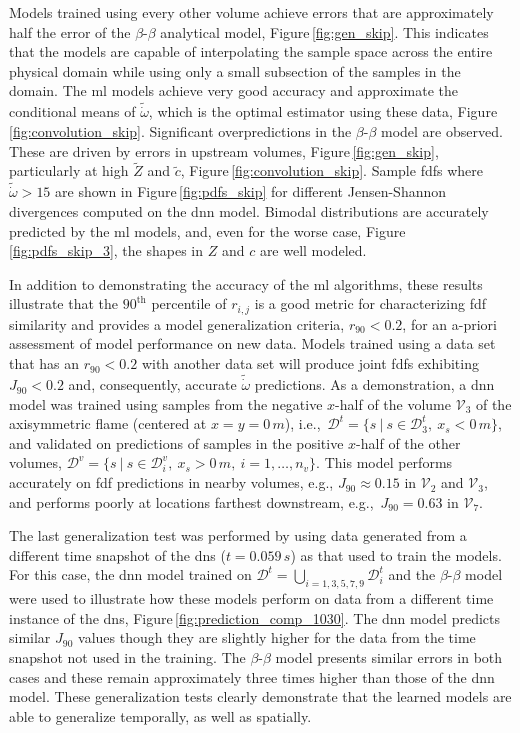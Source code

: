\documentclass[review]{elsarticle}
\newcommand{\wt}[1]{\widetilde{#1}}
\begin{document}
Models trained using every other volume achieve errors that are
approximately half the error of the $\beta$-$\beta$ analytical model,
Figure\,\ref{fig:gen_skip}. This indicates that the models are capable
of interpolating the sample space across the entire physical domain
while using only a small subsection of the samples in the domain. The
\gls{ml} models achieve very good accuracy and approximate the
conditional means of $\wt{\dot{\omega}}$, which is the optimal
estimator using these data,
Figure\,\ref{fig:convolution_skip}. Significant overpredictions in
the $\beta$-$\beta$ model are observed. These are driven by errors in
upstream volumes, Figure\,\ref{fig:gen_skip}, particularly at high
$\wt{Z}$ and $\wt{c}$, Figure\,\ref{fig:convolution_skip}. Sample \glspl{fdf}
where $\wt{\dot{\omega}} > 15$ are shown in
Figure\,\ref{fig:pdfs_skip} for different Jensen-Shannon divergences
computed on the \gls{dnn} model. Bimodal distributions are accurately
predicted by the \gls{ml} models, and, even for the worse
case, Figure\,\ref{fig:pdfs_skip_3}, the shapes in $Z$ and $c$ are well
modeled. 

In addition to demonstrating the accuracy of the \gls{ml}
algorithms, these results illustrate that the $90^{\text{th}}$
percentile of $r_{i,j}$ is a good metric for characterizing \gls{fdf}
similarity and provides a model generalization criteria,
$r_{90} < 0.2$, for an a-priori assessment of model performance on new
data. Models trained using a data set that has an $r_{90} < 0.2$ with
another data set will produce joint \glspl{fdf} exhibiting
$J_{90} < 0.2$ and, consequently, accurate $\wt{\dot{\omega}}$
predictions. As a demonstration, a \gls{dnn} model was trained using
samples from the negative $x$-half of the volume $\mathcal{V}_3$ of
the axisymmetric flame (centered at $x=y=0\,\unit{m}$), i.e.,\
$\mathcal{D}^t = \{ s~|~s \in \mathcal{D}_3^t,~x_s < 0\,\unit{m}\}$, and
validated on predictions of samples in the positive $x$-half of the
other volumes,
$\mathcal{D}^v = \{ s~|~s \in \mathcal{D}_i^v,~x_s >
0\,\unit{m},~i=1,\dots, n_v\}$. This model performs accurately on
\gls{fdf} predictions in nearby volumes, e.g., $J_{90} \approx 0.15$ in
$\mathcal{V}_2$ and $\mathcal{V}_3$, and performs poorly at locations
farthest downstream, e.g.,\ $J_{90} = 0.63$ in $\mathcal{V}_7$.

The last generalization test was performed by using data generated
from a different time snapshot of the \gls{dns} ($t=0.059\,\unit{s}$)
as that used to train the models. For this case, the \gls{dnn} model
trained on
$\mathcal{D}^t = \bigcup\limits_{i=1, 3, 5, 7, 9} \mathcal{D}_i^t$ and
the $\beta$-$\beta$ model were used to illustrate how these models
perform on data from a different time instance of the \gls{dns},
Figure\,\ref{fig:prediction_comp_1030}. The \gls{dnn} model predicts
similar $J_{90}$ values though they are slightly higher for the data
from the time snapshot not used in the training. The $\beta$-$\beta$
model presents similar errors in both cases and these remain
approximately three times higher than those of the \gls{dnn}
model. These generalization tests clearly demonstrate that the
learned models are able to generalize temporally, as well as
spatially.
\end{document}

